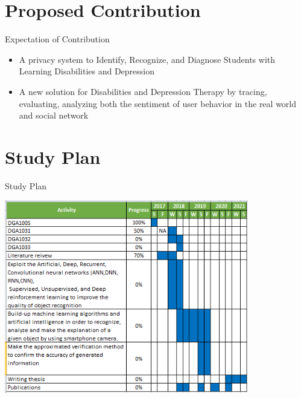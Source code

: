 \documentclass{beamer}
\begin{document}
\section{Proposed Contribution}

\begin{frame}{Expectation of Contribution}
\begin{itemize}
	
	\item  A privacy system to Identify, Recognize, and Diagnose Students with Learning Disabilities and Depression 
	\item A new solution for Disabilities and Depression Therapy by tracing, evaluating, analyzing both the sentiment of user behavior in the real world and social network
\end{itemize}
\end{frame}
\section{Study Plan}


\begin{frame}{Study Plan}
	\begin{center}
	\includegraphics[width=0.8\textwidth]{StudyPlan.png}
\end{center}
\end{frame}
\end{document}
